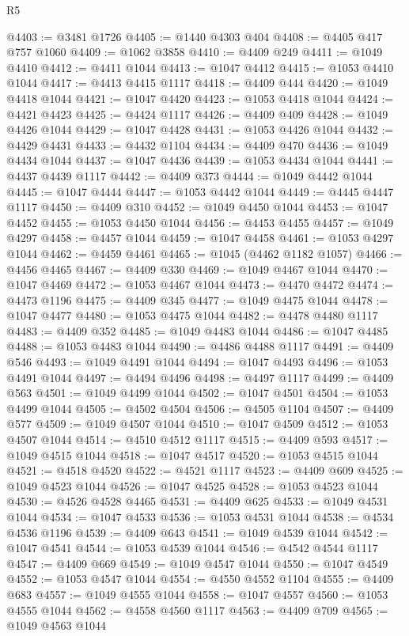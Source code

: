 \begin{lexlean}{R5}
\begin{coremodule}
@4403 := @3481 @1726
@4405 := @1440 @4303 @404
@4408 := @4405 @417 @757 @1060
@4409 := @1062 @3858
@4410 := @4409 @249
@4411 := @1049 @4410
@4412 := @4411 @1044
@4413 := @1047 @4412
@4415 := @1053 @4410 @1044
@4417 := @4413 @4415 @1117
@4418 := @4409 @444
@4420 := @1049 @4418 @1044
@4421 := @1047 @4420
@4423 := @1053 @4418 @1044
@4424 := @4421 @4423
@4425 := @4424 @1117
@4426 := @4409 @409
@4428 := @1049 @4426 @1044
@4429 := @1047 @4428
@4431 := @1053 @4426 @1044
@4432 := @4429 @4431
@4433 := @4432 @1104
@4434 := @4409 @470
@4436 := @1049 @4434 @1044
@4437 := @1047 @4436
@4439 := @1053 @4434 @1044
@4441 := @4437 @4439 @1117
@4442 := @4409 @373
@4444 := @1049 @4442 @1044
@4445 := @1047 @4444
@4447 := @1053 @4442 @1044
@4449 := @4445 @4447 @1117
@4450 := @4409 @310
@4452 := @1049 @4450 @1044
@4453 := @1047 @4452
@4455 := @1053 @4450 @1044
@4456 := @4453 @4455
@4457 := @1049 @4297
@4458 := @4457 @1044
@4459 := @1047 @4458
@4461 := @1053 @4297 @1044
@4462 := @4459 @4461
@4465 := @1045 (@4462 @1182 @1057)
@4466 := @4456 @4465
@4467 := @4409 @330
@4469 := @1049 @4467 @1044
@4470 := @1047 @4469
@4472 := @1053 @4467 @1044
@4473 := @4470 @4472
@4474 := @4473 @1196
@4475 := @4409 @345
@4477 := @1049 @4475 @1044
@4478 := @1047 @4477
@4480 := @1053 @4475 @1044
@4482 := @4478 @4480 @1117
@4483 := @4409 @352
@4485 := @1049 @4483 @1044
@4486 := @1047 @4485
@4488 := @1053 @4483 @1044
@4490 := @4486 @4488 @1117
@4491 := @4409 @546
@4493 := @1049 @4491 @1044
@4494 := @1047 @4493
@4496 := @1053 @4491 @1044
@4497 := @4494 @4496
@4498 := @4497 @1117
@4499 := @4409 @563
@4501 := @1049 @4499 @1044
@4502 := @1047 @4501
@4504 := @1053 @4499 @1044
@4505 := @4502 @4504
@4506 := @4505 @1104
@4507 := @4409 @577
@4509 := @1049 @4507 @1044
@4510 := @1047 @4509
@4512 := @1053 @4507 @1044
@4514 := @4510 @4512 @1117
@4515 := @4409 @593
@4517 := @1049 @4515 @1044
@4518 := @1047 @4517
@4520 := @1053 @4515 @1044
@4521 := @4518 @4520
@4522 := @4521 @1117
@4523 := @4409 @609
@4525 := @1049 @4523 @1044
@4526 := @1047 @4525
@4528 := @1053 @4523 @1044
@4530 := @4526 @4528 @4465
@4531 := @4409 @625
@4533 := @1049 @4531 @1044
@4534 := @1047 @4533
@4536 := @1053 @4531 @1044
@4538 := @4534 @4536 @1196
@4539 := @4409 @643
@4541 := @1049 @4539 @1044
@4542 := @1047 @4541
@4544 := @1053 @4539 @1044
@4546 := @4542 @4544 @1117
@4547 := @4409 @669
@4549 := @1049 @4547 @1044
@4550 := @1047 @4549
@4552 := @1053 @4547 @1044
@4554 := @4550 @4552 @1104
@4555 := @4409 @683
@4557 := @1049 @4555 @1044
@4558 := @1047 @4557
@4560 := @1053 @4555 @1044
@4562 := @4558 @4560 @1117
@4563 := @4409 @709
@4565 := @1049 @4563 @1044

\end{coremodule}
\end{lexlean}
